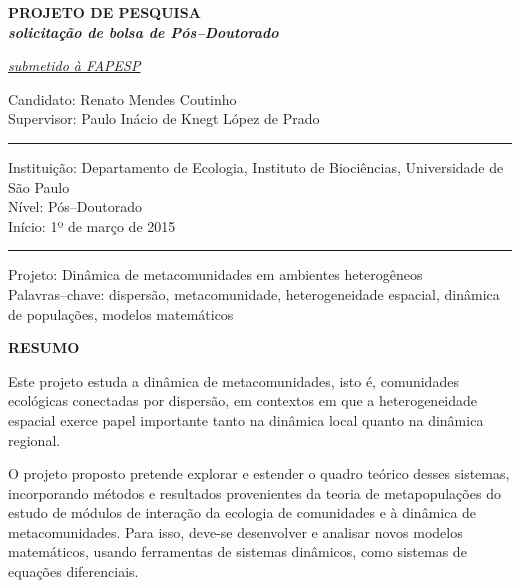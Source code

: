 \documentclass[12pt]{extarticle}
\begin{document}
\thispagestyle{empty}

\begin{center}
    \bf \Large \color{blue} PROJETO DE PESQUISA\\
    {\it \small  solicitação de bolsa de Pós--Doutorado}
\end{center}
\vskip 1.0cm
\hfill {\it \underline{submetido à FAPESP}}
\vskip 2.5cm

\setlength{\parindent}{0pt}
\doublespacing
{\sf \fontsize{13pt}{1.5em}\selectfont
Candidato: Renato Mendes Coutinho\\
Supervisor: Paulo Inácio de Knegt López de Prado\\

{\color{green}\hrule}
\vskip 1cm

Instituição: Departamento de Ecologia, Instituto de Biociências, Universidade de São Paulo\\
Nível: Pós--Doutorado\\
Início: 1º de março de 2015\\

{\color{green}\hrule}
\vskip 1cm

Projeto: Dinâmica de metacomunidades em ambientes heterogêneos\\
Palavras--chave: dispersão, metacomunidade, heterogeneidade espacial, dinâmica
de populações, modelos matemáticos
}

\newpage

\setlength{\parindent}{20pt}
\thispagestyle{empty}
\begin{center}
    \bf \Large \color{blue} RESUMO
\end{center}
\vskip 3.0cm
{\it

    Este projeto estuda a dinâmica de metacomunidades, isto é, comunidades
    ecológicas conectadas por dispersão, em contextos em que a heterogeneidade
    espacial exerce papel importante tanto na dinâmica local quanto na
    dinâmica regional.

    O projeto proposto pretende explorar e estender o quadro teórico desses
    sistemas, incorporando métodos e resultados provenientes da teoria de
    metapopulações do estudo de módulos de interação da ecologia de
    comunidades e à dinâmica de metacomunidades.  Para isso, deve-se
    desenvolver e analisar novos modelos matemáticos, usando ferramentas de
    sistemas dinâmicos, como sistemas de equações diferenciais.

    
%
%
}
\end{document}
